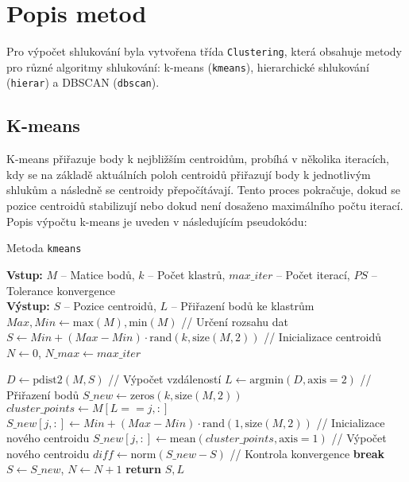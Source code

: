 \section{Popis metod}
Pro výpočet shlukování byla vytvořena třída \texttt{Clustering}, která obsahuje metody pro různé algoritmy shlukování: k-means (\texttt{kmeans}), hierarchické shlukování (\texttt{hierar}) a DBSCAN (\texttt{dbscan}).
\subsection{K-means}

K-means přiřazuje body k nejbližším centroidům, probíhá v několika iteracích, kdy se na základě aktuálních poloh centroidů přiřazují body k jednotlivým shlukům a následně se centroidy přepočítávají. Tento proces pokračuje, dokud se pozice centroidů stabilizují nebo dokud není dosaženo maximálního počtu iterací. Popis výpočtu k-means je uveden v následujícím pseudokódu:

\begin{algorithm}
    \caption{Metoda \texttt{kmeans}}
    \begin{algorithmic}[1]
        \STATE \textbf{Vstup:} $M$ -- Matice bodů, $k$ -- Počet klastrů, $max\_iter$ -- Počet iterací, $PS$ -- Tolerance konvergence\\
        \STATE \textbf{Výstup:} $S$ -- Pozice centroidů, $L$ -- Přiřazení bodů ke klastrům
        \STATE $Max, Min \gets \text{max}(M), \text{min}(M)$ // Určení rozsahu dat
        \STATE $S \gets Min + (Max - Min) \cdot \text{rand}(k, \text{size}(M, 2))$ // Inicializace centroidů
        \STATE $N \gets 0$, $N\_max \gets max\_iter$
        
            \STATE $D \gets \text{pdist2}(M, S)$ // Výpočet vzdáleností
            \STATE $L \gets \text{argmin}(D, \text{axis}=2)$ // Přiřazení bodů
            \STATE $S\_new \gets \text{zeros}(k, \text{size}(M, 2))$
                \STATE $cluster\_points \gets M[L == j, :]$
                    \STATE $S\_new[j, :] \gets Min + (Max - Min) \cdot \text{rand}(1, \text{size}(M, 2))$ // Inicializace nového centroidu
                \ELSE
                    \STATE $S\_new[j, :] \gets \text{mean}(cluster\_points, \text{axis}=1)$ // Výpočet nového centroidu
                \ENDIF
            \ENDFOR
            \STATE $diff \gets \text{norm}(S\_new - S)$ // Kontrola konvergence
             \STATE \textbf{break} \ENDIF
            \STATE $S \gets S\_new$, $N \gets N + 1$
        \ENDWHILE
        \STATE \textbf{return} $S, L$
    \end{algorithmic}
\end{algorithm}
\newpage

